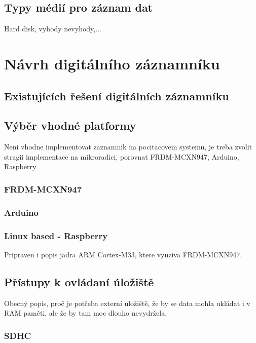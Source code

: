 \section{Typy médií pro záznam dat}
Hard disk, vyhody nevyhody,... 

\chapter{Návrh digitálního záznamníku}

\section{Existujících řešení digitálních záznamníku}

\section{Výběr vhodné platformy}
Neni vhodne implementovat zaznamnik na pocitacovem systemu, je treba zvolit stragii implementace na mikroradici, porovnat FRDM-MCXN947, Arduino, Raspberry
\subsection{FRDM-MCXN947}

\subsection{Arduino}

\subsection{Linux based - Raspberry}

Pripraven i popis jadra ARM Cortex-M33, ktere vyuziva FRDM-MCXN947.

\section{Přístupy k ovládaní úložiště}
Obecný popis, proč je potřeba externí uložiště, že by se data mohla ukládat i v RAM paměti, ale že by tam moc dlouho nevydržela, 

\subsection{SDHC}

